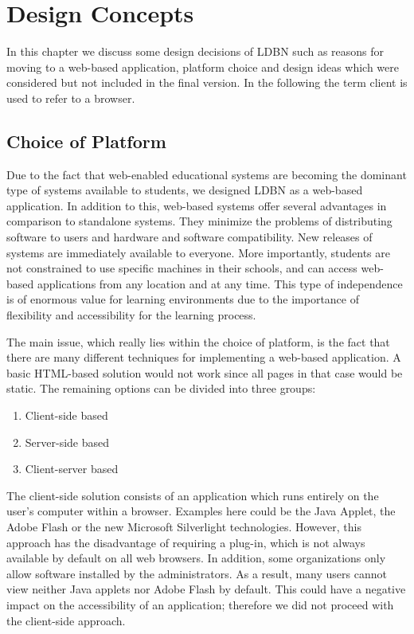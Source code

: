 \chapter{Design Concepts}
\label{chap:design}
In this chapter we discuss some design decisions of LDBN such as
reasons for moving to a web-based application, platform choice and 
design ideas which were considered but not included in the final version. In the following the
term client is used to refer to a browser.

\section{Choice of Platform}
Due to the fact that web-enabled educational 
systems are becoming the dominant type of systems 
available to students, we designed LDBN as a web-based application.
In addition to this, web-based systems offer several advantages in comparison to 
standalone systems. They minimize the problems of distributing software to users 
and hardware and software compatibility. New releases of systems are immediately
available to everyone. More importantly, students are not
constrained to use specific machines in their schools, and can access 
web-based applications from any location and at any time. This type of independence 
is of enormous value for learning environments due to the importance of
flexibility and accessibility for the learning process.
 
The main issue, which really lies within the choice of platform, is the fact that there are
many different techniques for implementing a web-based application. A basic HTML-based
solution would not work since all pages in that case would be static. The remaining 
options can be divided into three groups:

\begin{enumerate}
	\item Client-side based
	\item Server-side based
	\item Client-server based
\end{enumerate}

The client-side solution consists of an application which runs entirely on the user's 
computer within a browser. Examples here could be the Java Applet, the Adobe Flash or the new 
Microsoft Silverlight technologies. However, this approach has the disadvantage
of requiring a plug-in, which is not always available by default on all web browsers. 
In addition, some organizations only allow software installed by the administrators. 
As a result, many users cannot view neither Java applets nor Adobe Flash by default. This could 
have a negative impact on the accessibility of an application; 
therefore we did not proceed with the client-side approach.

